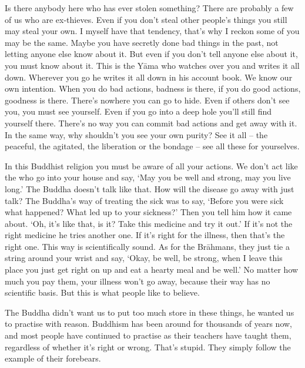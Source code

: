 Is there anybody here who has ever stolen something? There are probably a few of us who are ex-thieves. Even if you don't steal other people's things you still may steal your own. I myself have that tendency, that's why I reckon some of you may be the same. Maybe you have secretly done bad things in the past, not letting anyone else know about it. But even if you don't tell anyone else about it, you must know about it. This is the Y\=ama who watches over you and writes it all down. Wherever you go he writes it all down in his account book. We know our own intention. When you do bad actions, badness is there, if you do good actions, goodness is there. There's nowhere you can go to hide. Even if others don't see you, you must see yourself. Even if you go into a deep hole you'll still find yourself there. There's no way you can commit bad actions and get away with it. In the same way, why shouldn't you see your own purity? See it all -- the peaceful, the agitated, the liberation or the bondage -- see all these for yourselves.

In this Buddhist religion you must be aware of all your actions. We don't act like the  who go into your house and say, `May you be well and strong, may you live long.' The Buddha doesn't talk like that. How will the disease go away with just talk? The Buddha's way of treating the sick was to say, `Before you were sick what happened? What led up to your sickness?' Then you tell him how it came about. `Oh, it's like that, is it? Take this medicine and try it out.' If it's not the right medicine he tries another one. If it's right for the illness, then that's the right one. This way is scientifically sound. As for the Br\=ahmans, they just tie a string around your wrist and say, `Okay, be well, be strong, when I leave this place you just get right on up and eat a hearty meal and be well.' No matter how much you pay them, your illness won't go away, because their way has no scientific basis. But this is what people like to believe.

The Buddha didn't want us to put too much store in these things, he wanted us to practise with reason. Buddhism has been around for thousands of years now, and most people have continued to practise as their teachers have taught them, regardless of whether it's right or wrong. That's stupid. They simply follow the example of their forebears.

